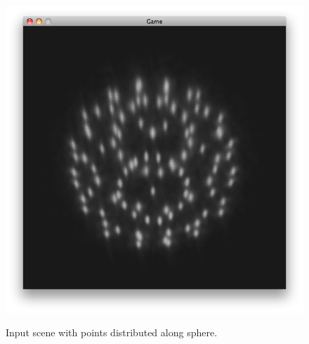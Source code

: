 \documentclass[twocolumn]{article}
\begin{document}
\begin{figure}
\begin{centering}
{	\includegraphics[bb=100bp 100bp 600bp 600bp,clip,scale=0.2]{figures/sphere.png}
	\label{sphere_output}}
	
\end{centering}
\caption{Input scene with points distributed along sphere.}
\end{figure}
\end{document}
